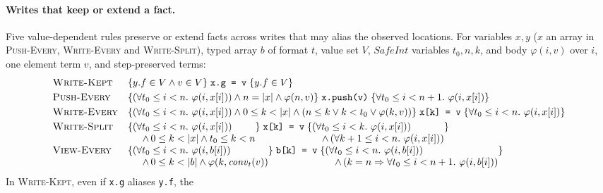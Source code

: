 \documentclass[10pt,a4paper]{article}
\theoremstyle{definition}
\theoremstyle{remark}
\newcommand{\len}[1]{|#1|}
\newcommand{\hoare}[3]{\{#1\}\;#2\;\{#3\}}
\newcommand{\code}[1]{\texttt{#1}}
\begin{document}
\paragraph{Writes that keep or extend a fact.}
Five value-dependent rules preserve or extend facts across writes that
may alias the observed locations. For variables $x,y$ ($x$ an array in
\textsc{Push-Every}, \textsc{Write-Every} and \textsc{Write-Split}), typed array $b$ of format $t$, value set $V$,
$\mathit{SafeInt}$ variables $t_0,n,k$, and body $\varphi(i,v)$ over $i$, one
element term $v$, and step-preserved terms:
{\small\begin{displaymath}
\begin{array}{@{}ll@{}}
\textsc{Write-Kept} & \hoare{y.f\in V\wedge v\in V}{\code{x.g = v}}{y.f\in V}\\[3pt]
\textsc{Push-Every} & \hoare{(\forall t_0\le i<n.\ \varphi(i,x[i]))\wedge n=\len x\wedge\varphi(n,v)}{\code{x.push(v)}}{\forall t_0\le i<n+1.\ \varphi(i,x[i])}\\[3pt]
\textsc{Write-Every} & \hoare{(\forall t_0\le i<n.\ \varphi(i,x[i]))\wedge 0\le k<\len x\wedge(n\le k\vee k<t_0\vee\varphi(k,v))}{\code{x[k] = v}}{\forall t_0\le i<n.\ \varphi(i,x[i])}\\[3pt]
\textsc{Write-Split} & \hoare{\begin{array}[t]{@{}l@{}}(\forall t_0\le i<n.\ \varphi(i,x[i]))\\ \quad\wedge\, 0\le k<\len x\wedge t_0\le k<n\end{array}}{\code{x[k] = v}}{\begin{array}[t]{@{}l@{}}(\forall t_0\le i<k.\ \varphi(i,x[i]))\\ \quad\wedge\,(\forall k+1\le i<n.\ \varphi(i,x[i]))\end{array}}\\[8pt]
\textsc{View-Every} & \hoare{\begin{array}[t]{@{}l@{}}(\forall t_0\le i<n.\ \varphi(i,b[i]))\\ \quad\wedge\, 0\le k<\len b\wedge\varphi(k,\mathit{conv}_t(v))\end{array}}{\code{b[k] = v}}{\begin{array}[t]{@{}l@{}}(\forall t_0\le i<n.\ \varphi(i,b[i]))\\ \quad\wedge\,(k=n\Rightarrow\forall t_0\le i<n+1.\ \varphi(i,b[i]))\end{array}}
\end{array}
\end{displaymath}}
In \textsc{Write-Kept}, even if \code{x.g} aliases \code{y.f}, the
\end{document}
